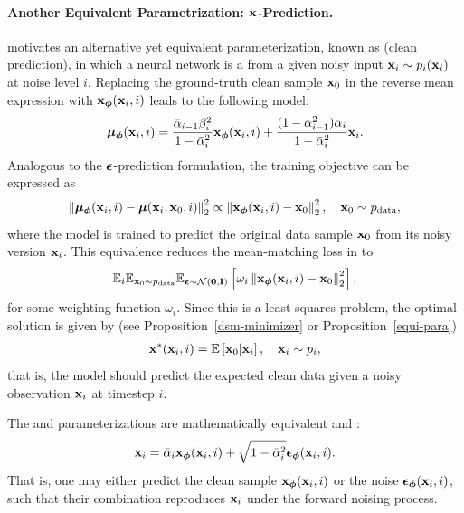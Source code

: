 \paragraph{Another Equivalent Parametrization: ${\mathbf{x}}$-Prediction.} 
 motivates an alternative yet equivalent parameterization, known as  (clean prediction), in which a neural network  is  a  from a given noisy input ${\mathbf{x}}_i \sim p_i({\mathbf{x}}_i)$ at noise level $i$. Replacing the ground-truth clean sample ${\mathbf{x}}_0$ in the reverse mean expression with ${\mathbf{x}}_{\bm{\phi}}({\mathbf{x}}_i, i)$ leads to the following model:
\begin{align*}
\bm{\mu}_{\bm{\phi}}({\mathbf{x}}_i, i) = \frac{\bar{\alpha}_{i-1} \beta_i^2}{1 - \bar{\alpha}_i^2} {\mathbf{x}}_{\bm{\phi}}({\mathbf{x}}_i, i) + \frac{(1 - \bar{\alpha}_{i-1}^2)\alpha_i}{1 - \bar{\alpha}_i^2} {\mathbf{x}}_i.
\end{align*}
Analogous to the ${\bm{\epsilon}}$-prediction formulation, the training objective can be expressed as
\[
\left\| \bm{\mu}_{\bm{\phi}}({\mathbf{x}}_i, i) - \bm{\mu}({\mathbf{x}}_i, {\mathbf{x}}_0, i) \right\|_2^2 \propto \left\| {\mathbf{x}}_{\bm{\phi}}({\mathbf{x}}_i, i) - {\mathbf{x}}_0 \right\|_2^2, \quad {\mathbf{x}}_0 \sim p_{\text{data}},
\]
where the model is trained to predict the original data sample ${\mathbf{x}}_0$ from its noisy version ${\mathbf{x}}_i$. This equivalence reduces the mean-matching loss in  to
\[
\mathbb{E}_{i} \mathbb{E}_{{\mathbf{x}}_0 \sim p_{\text{data}}} \mathbb{E}_{\boldsymbol{\epsilon} \sim \mathcal{N}(\mathbf{0}, \mathbf{I})} \left[\omega_i \left\| {\mathbf{x}}_{\bm{\phi}}({\mathbf{x}}_i, i) - {\mathbf{x}}_0 \right\|_2^2 \right],
\]
for some weighting function $\omega_i$. Since this is a least-squares problem, the optimal solution is given by (see Proposition~\ref{dsm-minimizer} or Proposition~\ref{equi-para}) 
\begin{align}\label{eq:ddpm-clean-minimizer}
    {\mathbf{x}}^*({\mathbf{x}}_i, i) = \mathbb{E}\left[ {\mathbf{x}}_0|{\mathbf{x}}_i \right], \quad {\mathbf{x}}_i \sim p_i,
\end{align}
that is, the model should predict the expected clean data given a noisy observation ${\mathbf{x}}_i$ at timestep $i$.

The  and  parameterizations are mathematically equivalent and :
\begin{equation}\label{eq:ddpm-clean-noise}
    {\mathbf{x}}_i = \bar{\alpha}_i {\mathbf{x}}_{\bm{\phi}}({\mathbf{x}}_i, i) + \sqrt{1 - \bar{\alpha}_i^2}   \boldsymbol{\epsilon}_{\bm{\phi}}({\mathbf{x}}_i, i).
\end{equation}
That is, one may either predict the clean sample ${\mathbf{x}}_{\bm{\phi}}({\mathbf{x}}_i, i)$ or the noise $\boldsymbol{\epsilon}_{\bm{\phi}}({\mathbf{x}}_i, i)$, such that their combination reproduces ${\mathbf{x}}_i$ under the forward noising process. 




